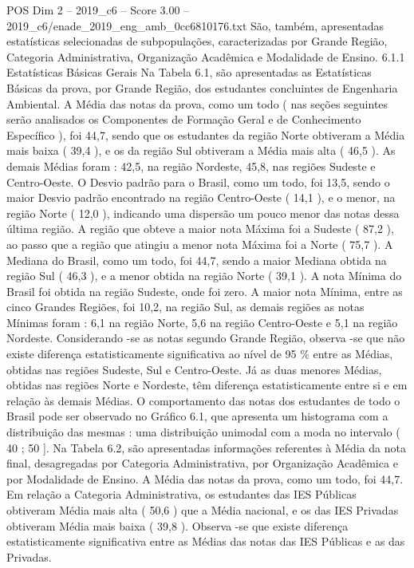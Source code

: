 \begin{textsample}{POS Dim 2 – 2019\_c6 – Score 3.00 – 2019\_c6/enade\_2019\_eng\_amb\_0cc6810176.txt}
São, também, apresentadas estatísticas selecionadas de subpopulações, caracterizadas por Grande Região, Categoria Administrativa, Organização Acadêmica e Modalidade de Ensino. 6.1.1 Estatísticas Básicas Gerais Na Tabela 6.1, são apresentadas as Estatísticas Básicas da prova, por Grande Região, dos estudantes concluintes de Engenharia Ambiental.
A Média das notas da prova, como um todo ( nas seções seguintes serão analisados os Componentes de Formação Geral e de Conhecimento Específico ), foi 44,7, sendo que os estudantes da região Norte obtiveram a Média mais baixa ( 39,4 ), e os da região Sul obtiveram a Média mais alta ( 46,5 ).
As demais Médias foram : 42,5, na região Nordeste, 45,8, nas regiões Sudeste e Centro-Oeste.
O Desvio padrão para o Brasil, como um todo, foi 13,5, sendo o maior Desvio padrão encontrado na região Centro-Oeste ( 14,1 ), e o menor, na região Norte ( 12,0 ), indicando uma dispersão um pouco menor das notas dessa última região.
A região que obteve a maior nota Máxima foi a Sudeste ( 87,2 ), ao passo que a região que atingiu a menor nota Máxima foi a Norte ( 75,7 ).
A Mediana do Brasil, como um todo, foi 44,7, sendo a maior Mediana obtida na região Sul ( 46,3 ), e a menor obtida na região Norte ( 39,1 ).
A nota Mínima do Brasil foi obtida na região Sudeste, onde foi zero.
A maior nota Mínima, entre as cinco Grandes Regiões, foi 10,2, na região Sul, as demais regiões as notas Mínimas foram : 6,1 na região Norte, 5,6 na região Centro-Oeste e 5,1 na região Nordeste.
Considerando -se as notas segundo Grande Região, observa -se que não existe diferença estatisticamente significativa ao nível de 95 \% entre as Médias, obtidas nas regiões Sudeste, Sul e Centro-Oeste.
Já as duas menores Médias, obtidas nas regiões Norte e Nordeste, têm diferença estatisticamente entre si e em relação às demais Médias.
O comportamento das notas dos estudantes de todo o Brasil pode ser observado no Gráfico 6.1, que apresenta um histograma com a distribuição das mesmas : uma distribuição unimodal com a moda no intervalo ( 40 ; 50 ].
Na Tabela 6.2, são apresentadas informações referentes à Média da nota final, desagregadas por Categoria Administrativa, por Organização Acadêmica e por Modalidade de Ensino.
A Média das notas da prova, como um todo, foi 44,7.
Em relação a Categoria Administrativa, os estudantes das IES Públicas obtiveram Média mais alta ( 50,6 ) que a Média nacional, e os das IES Privadas obtiveram Média mais baixa ( 39,8 ).
Observa -se que existe diferença estatisticamente significativa entre as Médias das notas das IES Públicas e as das Privadas.

\end{textsample}
